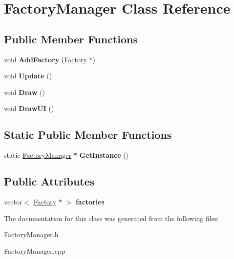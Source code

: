 \hypertarget{class_factory_manager}{}\section{Factory\+Manager Class Reference}
\label{class_factory_manager}
\subsection*{Public Member Functions}
\begin{DoxyCompactItemize}
\item 
void {\bfseries Add\+Factory} (\hyperlink{class_factory}{Factory} $\ast$)\hypertarget{class_factory_manager_a719880e2dbc42fbacd2296165e574689}{}\label{class_factory_manager_a719880e2dbc42fbacd2296165e574689}

\item 
void {\bfseries Update} ()\hypertarget{class_factory_manager_aa584cbd28f6e20c283dbc1b8eaf1aee9}{}\label{class_factory_manager_aa584cbd28f6e20c283dbc1b8eaf1aee9}

\item 
void {\bfseries Draw} ()\hypertarget{class_factory_manager_a6dd726dcff4ee3c44d89b678b3a16f3e}{}\label{class_factory_manager_a6dd726dcff4ee3c44d89b678b3a16f3e}

\item 
void {\bfseries Draw\+UI} ()\hypertarget{class_factory_manager_aa12a544409aafee24b2be4ce6a3d12eb}{}\label{class_factory_manager_aa12a544409aafee24b2be4ce6a3d12eb}

\end{DoxyCompactItemize}
\subsection*{Static Public Member Functions}
\begin{DoxyCompactItemize}
\item 
static \hyperlink{class_factory_manager}{Factory\+Manager} $\ast$ {\bfseries Get\+Instance} ()\hypertarget{class_factory_manager_a8df0a0a8011caed2936edd16916433ff}{}\label{class_factory_manager_a8df0a0a8011caed2936edd16916433ff}

\end{DoxyCompactItemize}
\subsection*{Public Attributes}
\begin{DoxyCompactItemize}
\item 
vector$<$ \hyperlink{class_factory}{Factory} $\ast$ $>$ {\bfseries factories}\hypertarget{class_factory_manager_aa179eaf890c694f6001b59e59dd20997}{}\label{class_factory_manager_aa179eaf890c694f6001b59e59dd20997}

\end{DoxyCompactItemize}


The documentation for this class was generated from the following files\+:\begin{DoxyCompactItemize}
\item 
Factory\+Manager.\+h\item 
Factory\+Manager.\+cpp\end{DoxyCompactItemize}
